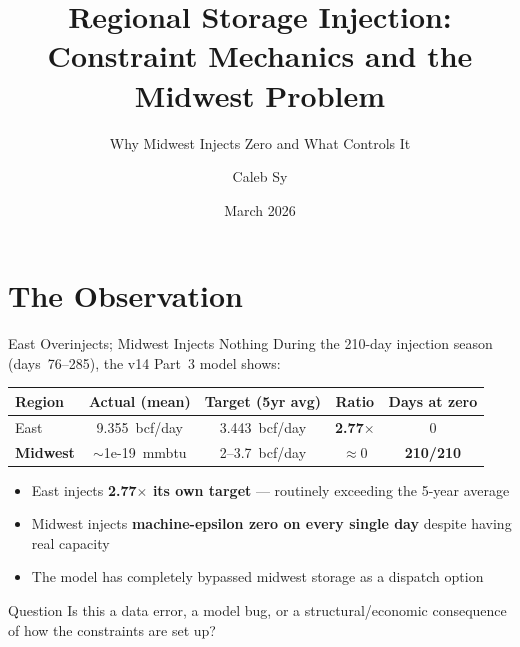 \documentclass[aspectratio=169, 11pt]{beamer}
\title{Regional Storage Injection:\\Constraint Mechanics and the Midwest Problem}
\subtitle{Why Midwest Injects Zero and What Controls It}
\author{Caleb Sy}
\date{March 2026}
\institute{PhD Research Briefing}
\begin{document}
\maketitle


\section{The Observation}

\begin{frame}{East Overinjects; Midwest Injects Nothing}
  During the 210-day injection season (days~76--285), the v14 Part~3 model shows:

  \vspace{0.5em}
  \begin{table}
    \centering
    \begin{tabular}{lcccc}
      \toprule
      \textbf{Region} & \textbf{Actual (mean)} & \textbf{Target (5yr avg)} & \textbf{Ratio} & \textbf{Days at zero} \\
      \midrule
      East   & 9.355~bcf/day & 3.443~bcf/day & \textbf{2.77$\times$} & 0 \\
      \textbf{Midwest} & \alert{$\sim$1e-19~mmbtu} & 2--3.7~bcf/day & \alert{$\approx$0} & \textbf{210/210} \\
      \bottomrule
    \end{tabular}
  \end{table}

  \vspace{0.5em}
  \begin{itemize}
    \item East injects \textbf{2.77$\times$ its own target} --- routinely exceeding the 5-year average
    \item Midwest injects \textbf{machine-epsilon zero on every single day} despite having real capacity
    \item The model has completely bypassed midwest storage as a dispatch option
  \end{itemize}

  \vspace{0.3em}
  \begin{block}{Question}
    Is this a data error, a model bug, or a structural/economic consequence of how the constraints are set up?
  \end{block}
\end{frame}
\end{document}
